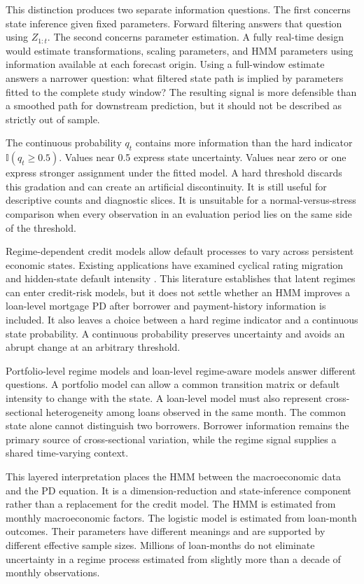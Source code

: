 This distinction produces two separate information questions. The first concerns state inference given fixed parameters. Forward filtering answers that question using $Z_{1:t}$. The second concerns parameter estimation. A fully real-time design would estimate transformations, scaling parameters, and HMM parameters using information available at each forecast origin. Using a full-window estimate answers a narrower question: what filtered state path is implied by parameters fitted to the complete study window? The resulting signal is more defensible than a smoothed path for downstream prediction, but it should not be described as strictly out of sample.

The continuous probability $q_t$ contains more information than the hard indicator $\mathbb{I}(q_t\geq0.5)$. Values near 0.5 express state uncertainty. Values near zero or one express stronger assignment under the fitted model. A hard threshold discards this gradation and can create an artificial discontinuity. It is still useful for descriptive counts and diagnostic slices. It is unsuitable for a normal-versus-stress comparison when every observation in an evaluation period lies on the same side of the threshold.

Regime-dependent credit models allow default processes to vary across persistent economic states. Existing applications have examined cyclical rating migration and hidden-state default intensity \citep{bangia_et_al_2002,yu2018modeling}. This literature establishes that latent regimes can enter credit-risk models, but it does not settle whether an HMM improves a loan-level mortgage PD after borrower and payment-history information is included. It also leaves a choice between a hard regime indicator and a continuous state probability. A continuous probability preserves uncertainty and avoids an abrupt change at an arbitrary threshold.

Portfolio-level regime models and loan-level regime-aware models answer different questions. A portfolio model can allow a common transition matrix or default intensity to change with the state. A loan-level model must also represent cross-sectional heterogeneity among loans observed in the same month. The common state alone cannot distinguish two borrowers. Borrower information remains the primary source of cross-sectional variation, while the regime signal supplies a shared time-varying context.

This layered interpretation places the HMM between the macroeconomic data and the PD equation. It is a dimension-reduction and state-inference component rather than a replacement for the credit model. The HMM is estimated from monthly macroeconomic factors. The logistic model is estimated from loan-month outcomes. Their parameters have different meanings and are supported by different effective sample sizes. Millions of loan-months do not eliminate uncertainty in a regime process estimated from slightly more than a decade of monthly observations.

